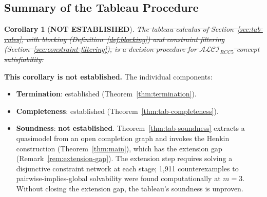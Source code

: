 \documentclass[a4paper,11pt]{article}
\newtheorem{corollary}[theorem]{Corollary}
\theoremstyle{definition}
\newcommand{\ALCIRCC}[1]{\ensuremath{\mathcal{ALCI}_{\mathit{RCC#1}}}}
\begin{document}
\subsection{Summary of the Tableau Procedure}

\begin{corollary}[\textbf{NOT ESTABLISHED}]
\label{cor:tableau-decides}
\sout{The tableau calculus of Section~\ref{sec:tab-rules}, with blocking
\textup{(}Definition~\ref{def:blocking}\textup{)} and constraint
filtering \textup{(}Section~\ref{sec:constraint-filtering}\textup{)},
is a decision procedure for $\ALCIRCC{5}$ concept satisfiability.}
\end{corollary}

\noindent
\textbf{This corollary is not established.}  The individual components:
\begin{itemize}[nosep]
  \item \textbf{Termination}: established
    (Theorem~\ref{thm:termination}).
  \item \textbf{Completeness}: established
    (Theorem~\ref{thm:tab-completeness}).
  \item \textbf{Soundness}: \textbf{not established}.
    Theorem~\ref{thm:tab-soundness} extracts a quasimodel from an
    open completion graph and invokes the Henkin construction
    (Theorem~\ref{thm:main}), which has the extension gap
    (Remark~\ref{rem:extension-gap}).  The extension step requires
    solving a disjunctive constraint network at each stage; 1,911
    counterexamples to pairwise-implies-global solvability were found
    computationally at $m = 3$.  Without closing the extension gap,
    the tableau's soundness is unproven.
\end{itemize}
\end{document}
